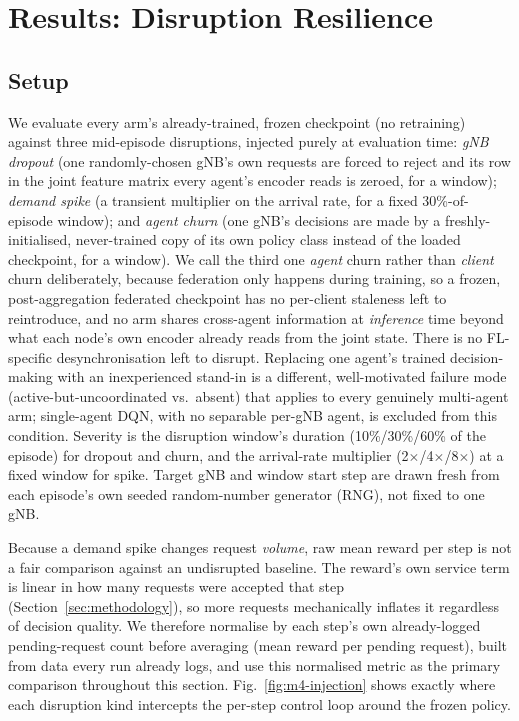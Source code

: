 \documentclass[journal]{IEEEtran}
\begin{document}
\section{Results: Disruption Resilience}
\label{sec:results-m4}

\subsection{Setup}
We evaluate every arm's already-trained, frozen checkpoint (no
retraining) against three mid-episode disruptions, injected purely at
evaluation time: \emph{gNB dropout} (one randomly-chosen gNB's own
requests are forced to reject and its row in the joint feature matrix
every agent's encoder reads is zeroed, for a window); \emph{demand
spike} (a transient multiplier on the arrival rate, for a fixed
30\%-of-episode window); and \emph{agent churn} (one gNB's decisions
are made by a freshly-initialised, never-trained copy of its own policy
class instead of the loaded checkpoint, for a window). We call the
third one \emph{agent} churn rather than \emph{client} churn
deliberately, because federation only happens during training, so a frozen,
post-aggregation federated checkpoint has no per-client staleness left
to reintroduce, and no arm shares cross-agent information at
\emph{inference} time beyond what each node's own encoder already reads
from the joint state. There is no FL-specific desynchronisation left
to disrupt. Replacing one agent's trained decision-making with an
inexperienced stand-in is a different, well-motivated failure mode
(active-but-uncoordinated vs.\ absent) that applies to every genuinely
multi-agent arm; single-agent DQN, with no separable per-gNB agent, is
excluded from this condition. Severity is the disruption window's
duration (10\%/30\%/60\% of the episode) for dropout and churn, and the
arrival-rate multiplier (2$\times$/4$\times$/8$\times$) at a fixed
window for spike. Target gNB and window start step are drawn fresh from
each episode's own seeded random-number generator (RNG), not fixed to
one gNB.

Because a demand spike changes request \emph{volume}, raw mean reward
per step is not a fair comparison against an undisrupted baseline.
The reward's own service term is linear in how many requests were
accepted that step (Section~\ref{sec:methodology}), so more requests
mechanically inflates it regardless of decision quality. We therefore
normalise by each step's own already-logged pending-request count
before averaging (mean reward per pending request), built from data
every run already logs, and use this normalised metric as the primary
comparison throughout this section. Fig.~\ref{fig:m4-injection} shows
exactly where each disruption kind intercepts the per-step control loop
around the frozen policy.
\end{document}
